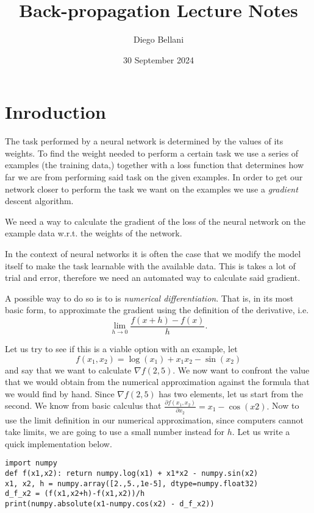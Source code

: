 \documentclass{article}
\title{Back-propagation Lecture Notes}
\author{Diego Bellani}
\date{30 September 2024}
\newcommand{\partialfrac}[2]{\frac{\partial #1}{\partial #2}}
\begin{document}
\maketitle

\section{Inroduction}

The task performed by a neural network is determined by the values of its weights.
To find the weight needed to perform a certain task we use a series of examples
(the training data,) together with a loss function that determines how far we are
from performing said task on the given examples. In order to get our network
closer to perform the task we want on the examples we use a \emph{gradient}
descent algorithm.

We need a way to calculate the gradient of the loss of the neural network on
the example data w.r.t. the weights of the network.

In the context of neural networks it is often the case that we modify the model
itself to make the task learnable with the available data. This is takes a lot of
trial and error, therefore we need an automated way to calculate said gradient.

A possible way to do so is to is \emph{numerical differentiation}. That is, in
its most basic form, to approximate the gradient using the definition of the
derivative, i.e. \[\lim_{h \to 0} \frac{f(x+h)-f(x)} h.\]

Let us try to see if this is a viable option with an example, let
\begin{equation}
f(x_1, x_2) = \log(x_1)+x_1x_2-\sin(x_2) \label{eqn:example}
\end{equation}
and say that we want to calculate \(\nabla{f(2,5)}.\) We now want to confront
the value that we would obtain from the numerical approximation against the
formula that we would find by hand. Since \(\nabla{f(2,5)}\) has two elements,
let us start from the second. We know from basic calculus that
\(\partialfrac{f(x_1,x_2)}{x_2} = x_1-\cos(x2).\) Now to use the limit
definition in our numerical approximation, since computers cannot take limits,
we are going to use a small number instead for \(h.\) Let us write a quick
implementation below.

\begin{verbatim}
import numpy
def f(x1,x2): return numpy.log(x1) + x1*x2 - numpy.sin(x2)
x1, x2, h = numpy.array([2.,5.,1e-5], dtype=numpy.float32)
d_f_x2 = (f(x1,x2+h)-f(x1,x2))/h
print(numpy.absolute(x1-numpy.cos(x2) - d_f_x2))
\end{verbatim}
\end{document}
